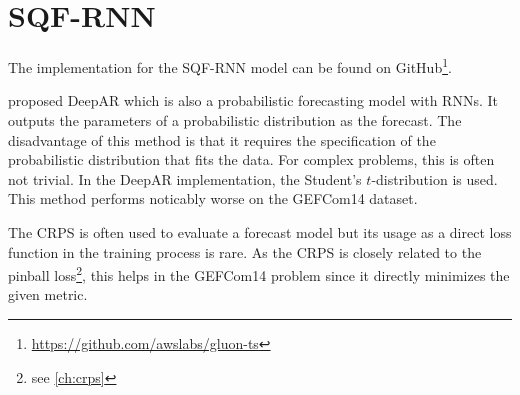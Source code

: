 \section{SQF-RNN}
\label{sec:implementation-sqf-rnn}

The implementation for the SQF-RNN model can be found on GitHub\footnote{\url{https://github.com/awslabs/gluon-ts}}.

\Textcite{Salinas2017} proposed DeepAR which is also a 
probabilistic forecasting model with RNNs. It outputs the 
parameters of a probabilistic distribution as the forecast. 
The disadvantage of this method is that it requires the 
specification of the probabilistic distribution that fits the data. 
For complex problems, this is often not trivial. 
In the DeepAR implementation, the Student's \(t\)-distribution is used. 
This method performs noticably worse on the GEFCom14 dataset. 

The CRPS is often used to evaluate a forecast model but its usage as 
a direct loss function in the training process is rare. 
As the CRPS is closely related to the pinball loss\footnote{see \ref{ch:crps}}, 
this helps in the GEFCom14 problem since it directly minimizes the given metric.
